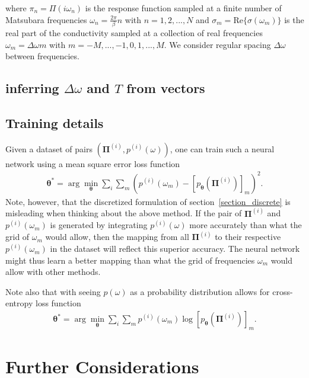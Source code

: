 \documentclass[notitlepage,11pt,nofootinbib]{revtex4-1}
\renewcommand{\vec}[1]{\bm{#1}}
\begin{document}
where $\pi_n = \Pi(i\omega_n)$ is the response function sampled at a finite number of Matsubara frequencies $\omega_{n} = \frac{2\pi}{\beta}n$ with $n=1,2,...,N$ and $\sigma_m=\text{Re}\{\sigma(\omega_m)\}$ is the real part of the conductivity sampled at a collection of real frequencies $\omega_m = \Delta\omega m$ with $m=-M,...,-1,0,1,...,M$. We consider regular spacing $\Delta\omega$ between frequencies.

\subsection{inferring $\Delta\omega$ and $T$ from vectors}


\subsection{Training details}

Given a dataset of pairs $(\vec\Pi^{(i)},p^{(i)}(\omega))$, one can train such a neural network using a mean square error loss function
\begin{align}
\vec \theta^* = \arg\min_{\vec \theta} 
\sum_i \sum_m \left(
p^{(i)}(\omega_m) -
\left[p_{\vec \theta}\left(\vec \Pi^{(i)}\right)\right]_m
\right )^2.
\end{align}
Note, however, that the discretized formulation of section~\ref{section_discrete} is misleading when thinking about the above method.
If the pair of $\vec \Pi^{(i)}$ and $p^{(i)}(\omega_m)$ is generated by integrating $p^{(i)}(\omega)$ more accurately than what the grid of $\omega_m$ would allow, then the mapping from all $\vec \Pi^{(i)}$ to their respective $p^{(i)}(\omega_m)$ in the dataset will reflect this superior accuracy.
The neural network might thus learn a better mapping than what the grid of frequencies $\omega_m$ would allow with other methods.


Note also that with seeing $p(\omega)$ as a probability distribution allows for cross-entropy loss function
\begin{align}
\vec \theta^* = \arg\min_{\vec \theta} 
\sum_i \sum_m
p^{(i)}(\omega_m)\log
\left[p_{\vec \theta}\left(\vec \Pi^{(i)}\right)\right]_m.
\end{align}


\section{Further Considerations}
\end{document}
